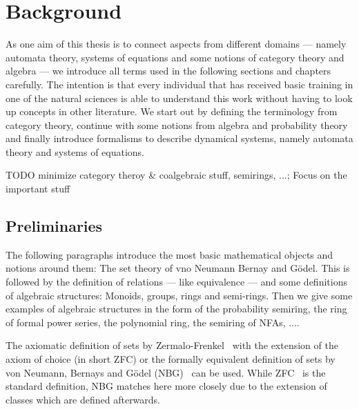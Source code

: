 \chapter{Background}\label{\positionnumber} 
    As one aim of this thesis is to connect aspects from different domains --- namely automata theory, systems of equations and some notions of category theory and algebra --- we introduce all terms used in the following sections and chapters carefully. The intention is that every individual that has received basic training in one of the natural sciences is able to understand this work without having to look up concepts in other literature.
    We start out by defining the terminology from category theory, continue with some notions from algebra and probability theory and finally introduce formalisms to describe dynamical systems, namely automata theory and systems of equations.
    
    TODO minimize category theroy \& coalgebraic stuff, semirings, ...; Focus on the important stuff
    
        \section{Preliminaries}
            The following paragraphs introduce the most basic mathematical objects and notions around them: The set theory of vno Neumann Bernay and Gödel. This is followed by the definition of relations --- like equivalence --- and some definitions of algebraic structures: Monoids, groups, rings and semi-rings.
            Then we give some examples of algebraic structures in the form of the probability semiring, the ring of formal power series, the polynomial ring, the semiring of NFAs, ....
        
        
            The axiomatic definition of sets by Zermalo-Frenkel~\autocite{ZF} with the extension of the axiom of choice (in short ZFC) or the formally equivalent definition of sets by von Neumann, Bernays and Gödel (NBG)~\autocite{NBG} can be used. While ZFC~\autocite{ZFC} is the standard definition, NBG matches here more closely due to the extension of classes which are defined afterwards. \\
                
